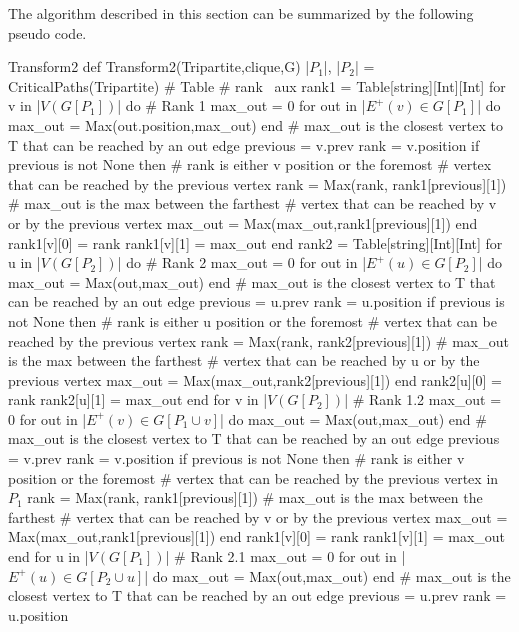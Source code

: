 The algorithm described in this section can be summarized by the following pseudo code.
\begin{code}{Transform2}
def Transform2(Tripartite,clique,G)
  |$P_1$|, |$P_2$| = CriticalPaths(Tripartite)
  # Table
  # rank \ aux
  rank1 = Table[string][Int][Int]
  for v in |$V(G[P_1])$| do # Rank 1
    max_out = 0
    for out in |$E^+(v) \in G[P_1]$| do
      max_out = Max(out.position,max_out)
    end # max_out is the closest vertex to T that can be reached by an out edge
    previous = v.prev
    rank = v.position
    if previous is not None then
      # rank is either v position or the foremost
      # vertex that can be reached by the previous vertex
      rank = Max(rank, rank1[previous][1])
      # max_out is the max between the farthest
      # vertex that can be reached by v or by the previous vertex
      max_out = Max(max_out,rank1[previous][1])
    end
    rank1[v][0] = rank
    rank1[v][1] = max_out
  end
  rank2 = Table[string][Int][Int]
  for u in |$V(G[P_2])$| do # Rank 2
    max_out = 0
    for out in |$E^+(u) \in G[P_2]$| do
      max_out = Max(out,max_out)
    end # max_out is the closest vertex to T that can be reached by an out edge
    previous = u.prev
    rank = u.position
    if previous is not None then
      # rank is either u position or the foremost
      # vertex that can be reached by the previous vertex
      rank = Max(rank, rank2[previous][1])
      # max_out is the max between the farthest
      # vertex that can be reached by u or by the previous vertex
      max_out = Max(max_out,rank2[previous][1])
    end
    rank2[u][0] = rank
    rank2[u][1] = max_out
  end
  for v in |$V(G[P_2])$| # Rank 1.2
    max_out = 0
    for out in |$E^+(v) \in G[P_1 \cup v]$| do
      max_out = Max(out,max_out)
    end # max_out is the closest vertex to T that can be reached by an out edge
    previous = v.prev
    rank = v.position
    if previous is not None then
      # rank is either v position or the foremost
      # vertex that can be reached by the previous vertex in $P_1$
      rank = Max(rank, rank1[previous][1])
      # max_out is the max between the farthest
      # vertex that can be reached by v or by the previous vertex
      max_out = Max(max_out,rank1[previous][1])
    end
    rank1[v][0] = rank
    rank1[v][1] = max_out
  end
  for u in |$V(G[P_1])$| # Rank 2.1
    max_out = 0
    for out in |$E^+(u) \in G[P_2 \cup u]$| do
      max_out = Max(out,max_out)
    end # max_out is the closest vertex to T that can be reached by an out edge
    previous = u.prev
    rank = u.position

\end{code}
